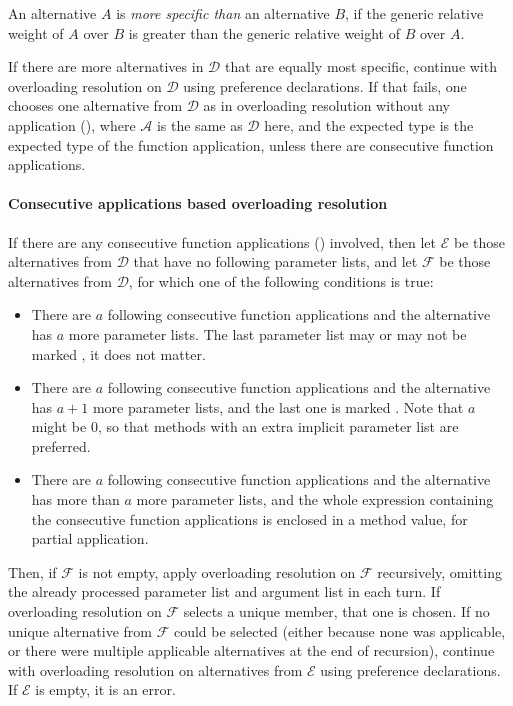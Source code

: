An alternative $A$ is {\em more specific than} an alternative $B$, if the generic relative weight of $A$ over $B$ is greater than the generic relative weight of $B$ over $A$. 

If there are more alternatives in $\mathcal{D}$ that are equally most specific, continue with overloading resolution on $\mathcal{D}$ using preference declarations. If that fails, one chooses one alternative from $\mathcal{D}$ as in overloading resolution without any application (), where $\mathcal{A}$ is the same as $\mathcal{D}$ here, and the expected type is the expected type of the function application, unless there are consecutive function applications. 

\paragraph{Consecutive applications based overloading resolution}
If there are any consecutive function applications () involved, then let $\mathcal{E}$ be those alternatives from $\mathcal{D}$ that have no following parameter lists, and let $\mathcal{F}$ be those alternatives from $\mathcal{D}$, for which one of the following conditions is true:
\begin{itemize}
  \item There are $a$ following consecutive function applications and the alternative has $a$ more parameter lists. The last parameter list may or may not be marked , it does not matter. 
  \item There are $a$ following consecutive function applications and the alternative has $a + 1$ more parameter lists, and the last one is marked . Note that $a$ might be 0, so that methods with an extra implicit parameter list are preferred. 
  \item There are $a$ following consecutive function applications and the alternative has more than $a$ more parameter lists, and the whole expression containing the consecutive function applications is enclosed in a method value, for partial application. 
\end{itemize}
Then, if $\mathcal{F}$ is not empty, apply overloading resolution on $\mathcal{F}$ recursively, omitting the already processed parameter list and argument list in each turn. If overloading resolution on $\mathcal{F}$ selects a unique member, that one is chosen. If no unique alternative from $\mathcal{F}$ could be selected (either because none was applicable, or there were multiple applicable alternatives at the end of recursion), continue with overloading resolution on alternatives from $\mathcal{E}$ using preference declarations. If $\mathcal{E}$ is empty, it is an error. 

